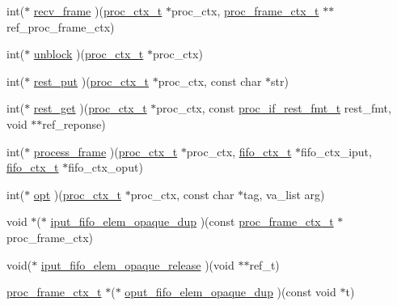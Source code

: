 \begin{DoxyCompactItemize}
\item 
int($\ast$ \hyperlink{structproc__if__s_a43115b2b1fa63fbfca191c18f28f2fea}{recv\+\_\+frame} )(\hyperlink{proc_8h_ae264f89be30fc03f5053bc16d58cba05}{proc\+\_\+ctx\+\_\+t} $\ast$proc\+\_\+ctx, \hyperlink{structproc__frame__ctx__s}{proc\+\_\+frame\+\_\+ctx\+\_\+t} $\ast$$\ast$ref\+\_\+proc\+\_\+frame\+\_\+ctx)
\item 
int($\ast$ \hyperlink{structproc__if__s_a19d63c8db2cbfb227134f5a5bd5c8561}{unblock} )(\hyperlink{proc_8h_ae264f89be30fc03f5053bc16d58cba05}{proc\+\_\+ctx\+\_\+t} $\ast$proc\+\_\+ctx)
\item 
int($\ast$ \hyperlink{structproc__if__s_acb4d2c240c52904ebd6904f54b1a9b78}{rest\+\_\+put} )(\hyperlink{proc_8h_ae264f89be30fc03f5053bc16d58cba05}{proc\+\_\+ctx\+\_\+t} $\ast$proc\+\_\+ctx, const char $\ast$str)
\item 
int($\ast$ \hyperlink{structproc__if__s_a1e45b33c52b931954f7a0d8a14f0db53}{rest\+\_\+get} )(\hyperlink{proc_8h_ae264f89be30fc03f5053bc16d58cba05}{proc\+\_\+ctx\+\_\+t} $\ast$proc\+\_\+ctx, const \hyperlink{proc__if_8h_a9bea3dae53a91f2a3e3a459d1d3e22b3}{proc\+\_\+if\+\_\+rest\+\_\+fmt\+\_\+t} rest\+\_\+fmt, void $\ast$$\ast$ref\+\_\+reponse)
\item 
int($\ast$ \hyperlink{structproc__if__s_ab67b4061f94b6f15ae40c796b6b33597}{process\+\_\+frame} )(\hyperlink{proc_8h_ae264f89be30fc03f5053bc16d58cba05}{proc\+\_\+ctx\+\_\+t} $\ast$proc\+\_\+ctx, \hyperlink{fifo_8c_acf3f21e64cbabccd8420c306740820c1}{fifo\+\_\+ctx\+\_\+t} $\ast$fifo\+\_\+ctx\+\_\+iput, \hyperlink{fifo_8c_acf3f21e64cbabccd8420c306740820c1}{fifo\+\_\+ctx\+\_\+t} $\ast$fifo\+\_\+ctx\+\_\+oput)
\item 
int($\ast$ \hyperlink{structproc__if__s_a4ca0939d6721f368d2560851197fca36}{opt} )(\hyperlink{proc_8h_ae264f89be30fc03f5053bc16d58cba05}{proc\+\_\+ctx\+\_\+t} $\ast$proc\+\_\+ctx, const char $\ast$tag, va\+\_\+list arg)
\item 
void $\ast$($\ast$ \hyperlink{structproc__if__s_a558cec57df436699d4154775894f2313}{iput\+\_\+fifo\+\_\+elem\+\_\+opaque\+\_\+dup} )(const \hyperlink{structproc__frame__ctx__s}{proc\+\_\+frame\+\_\+ctx\+\_\+t} $\ast$proc\+\_\+frame\+\_\+ctx)
\item 
void($\ast$ \hyperlink{structproc__if__s_aec3bf948ff945ac2f5a4c834ea3b57da}{iput\+\_\+fifo\+\_\+elem\+\_\+opaque\+\_\+release} )(void $\ast$$\ast$ref\+\_\+t)
\item 
\hyperlink{structproc__frame__ctx__s}{proc\+\_\+frame\+\_\+ctx\+\_\+t} $\ast$($\ast$ \hyperlink{structproc__if__s_a7806bbda25988d9ee54f6d0bb143c697}{oput\+\_\+fifo\+\_\+elem\+\_\+opaque\+\_\+dup} )(const void $\ast$t)
\end{DoxyCompactItemize}


